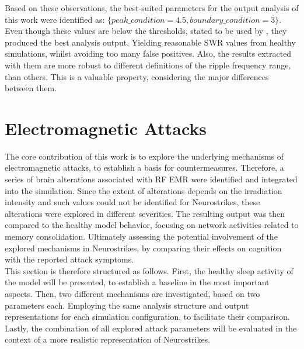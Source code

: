 Based on these observations, the best-suited parameters for the output analysis of this work were identified as: \(\{peak\_condition = 4.5, boundary\_condition = 3\}\). Even though these values are below the thresholds, stated to be used by \textcite{AmelieAussel.2020}, they produced the best analysis output. Yielding reasonable SWR values from healthy simulations, whilst avoiding too many false positives. Also, the results extracted with them are more robust to different definitions of the ripple frequency range, than others. This is a valuable property, considering the major differences between them.



\section{Electromagnetic Attacks}
The core contribution of this work is to explore the underlying mechanisms of electromagnetic attacks, to establish a basis for countermeasures. Therefore, a series of brain alterations associated with RF EMR were identified and integrated into the simulation. Since the extent of alterations depends on the irradiation intensity and such values could not be identified for Neurostrikes, these alterations were explored in different severities. The resulting output was then compared to the healthy model behavior, focusing on network activities related to memory consolidation. Ultimately assessing the potential involvement of the explored mechanisms in Neurostrikes, by comparing their effects on cognition with the reported attack symptoms.\\
This section is therefore structured as follows. First, the healthy sleep activity of the model will be presented, to establish a baseline in the most important aspects. Then, two different mechanisms are investigated, based on two parameters each. Employing the same analysis structure and output representations for each simulation configuration, to facilitate their comparison. Lastly, the combination of all explored attack parameters will be evaluated in the context of a more realistic representation of Neurostrikes.

